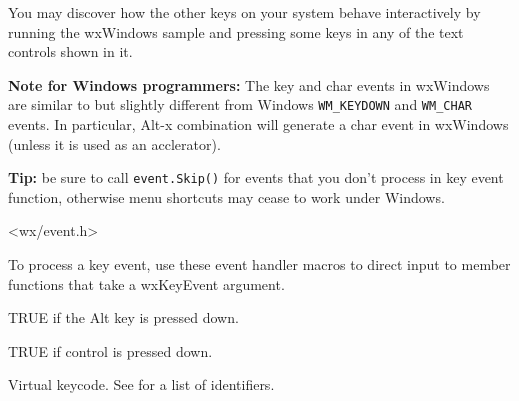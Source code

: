 You may discover how the other keys on your system behave interactively by
running the  wxWindows sample and pressing some keys
in any of the text controls shown in it.

{\bf Note for Windows programmers:} The key and char events in wxWindows are
similar to but slightly different from Windows {\tt WM\_KEYDOWN} and
{\tt WM\_CHAR} events. In particular, Alt-x combination will generate a char
event in wxWindows (unless it is used as an acclerator).

{\bf Tip:} be sure to call {\tt event.Skip()} for events that you don't process in
key event function, otherwise menu shortcuts may cease to work under Windows.




<wx/event.h>


To process a key event, use these event handler macros to direct input to member
functions that take a wxKeyEvent argument.

\twocolwidtha{7cm}
\begin{twocollist}\itemsep=0pt
\end{twocollist}%





TRUE if the Alt key is pressed down.



TRUE if control is pressed down.



Virtual keycode. See  for a list of identifiers.



